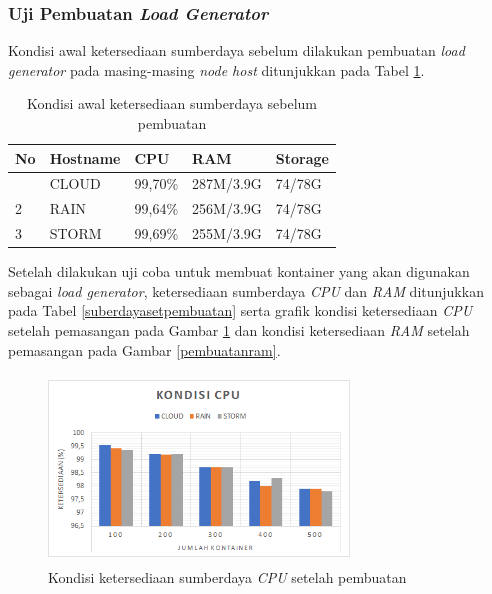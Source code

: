 			\subsubsection{Uji Pembuatan \textit{Load Generator}}
				Kondisi awal ketersediaan sumberdaya sebelum dilakukan pembuatan \textit{load generator} pada masing-masing \textit{node host} ditunjukkan pada Tabel \ref{suberdayaawalpembuatan}.
				\begin{longtable}{|p{}|p{}|p{}|p{}|p{}|}
					\caption{Kondisi awal ketersediaan sumberdaya sebelum pembuatan} \label{suberdayaawalpembuatan} \\
					\hline
					\textbf{No} & \textbf{Hostname} & \textbf{CPU} & \textbf{RAM} & \textbf{Storage} \\ \hline
					\endhead
					\endfoot
					\endlastfoot
					1 & CLOUD & 99,70\% & 287M/3.9G & 74/78G \\ \hline
					2 & RAIN & 99,64\% & 256M/3.9G & 74/78G \\ \hline
					3 & STORM & 99,69\% & 255M/3.9G & 74/78G \\ \hline
				\end{longtable}
			
				Setelah dilakukan uji coba untuk membuat kontainer yang akan digunakan sebagai \textit{load generator}, 
				ketersediaan sumberdaya \textit{CPU} dan \textit{RAM} ditunjukkan pada Tabel \ref{suberdayasetpembuatan} serta grafik  kondisi ketersediaan \textit{CPU} setelah pemasangan pada Gambar \ref{pembuatancpu} dan kondisi ketersediaan \textit{RAM} setelah pemasangan pada Gambar \ref{pembuatanram}.
				
				\begin{figure}[H]
					\centering
					\includegraphics[width=8cm,height=5cm]{Images/C-5/pembuatancpu.png}
					\caption{Kondisi ketersediaan sumberdaya \textit{CPU} setelah pembuatan}
					\label{pembuatancpu}
				\end{figure}
				
